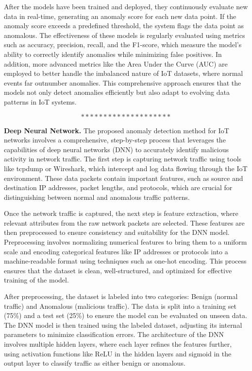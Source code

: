 After the models have been trained and deployed, they continuously evaluate new data in real-time, generating an anomaly score for each new data point. If the anomaly score exceeds a predefined threshold, the system flags the data point as anomalous. The effectiveness of these models is regularly evaluated using metrics such as accuracy, precision, recall, and the F1-score, which measure the model's ability to correctly identify anomalies while minimizing false positives. In addition, more advanced metrics like the Area Under the Curve (AUC) are employed to better handle the imbalanced nature of IoT datasets, where normal events far outnumber anomalies. This comprehensive approach ensures that the models not only detect anomalies efficiently but also adapt to evolving data patterns in IoT systems\cite{79}.

$$********************$$

\textbf{Deep Neural Network.} The proposed anomaly detection method for IoT networks involves a comprehensive, step-by-step process that leverages the capabilities of deep neural networks (DNN) to accurately identify malicious activity in network traffic. The first step is capturing network traffic using tools like tcpdump or Wireshark, which intercept and log data flowing through the IoT environment. These data packets contain important features, such as source and destination IP addresses, packet lengths, and protocols, which are crucial for distinguishing between normal and anomalous traffic patterns.

Once the network traffic is captured, the next step is feature extraction, where relevant attributes from the raw network packets are selected. These features are then preprocessed to ensure consistency and suitability for the DNN model. Preprocessing involves normalizing numerical features to bring them to a uniform scale and encoding categorical features like IP addresses or protocols into a machine-readable format using techniques such as one-hot encoding. This process ensures that the dataset is clean, well-structured, and optimized for effective training of the model.

After preprocessing, the dataset is labeled into two categories: Benign (normal traffic) and Anomalous (malicious traffic). The data is split into a training set (75\%) and a test set (25\%) to ensure the model can be evaluated on unseen data. The DNN model is then trained using the labeled dataset, adjusting its internal parameters to minimize classification errors. The architecture of the DNN involves multiple hidden layers, where each layer refines the features further, using activation functions like ReLU in the hidden layers and sigmoid in the output layer to classify traffic as either benign or anomalous.

